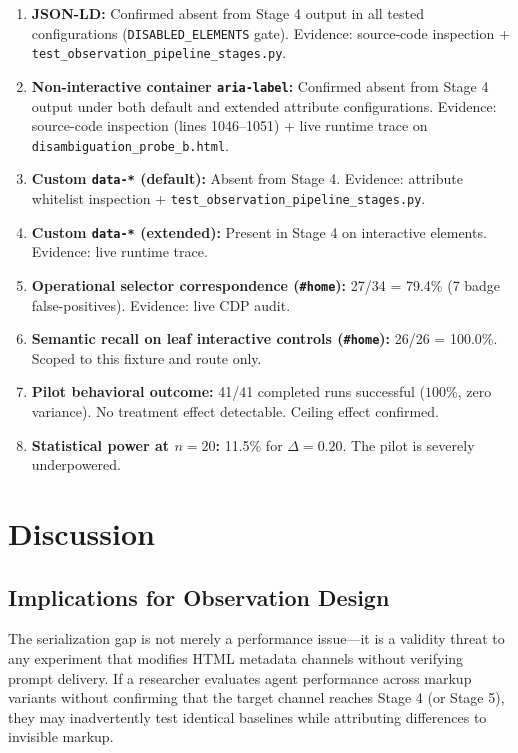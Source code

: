 \documentclass[conference]{IEEEtran}
\begin{document}
\begin{enumerate}
    \item \textbf{JSON-LD:} Confirmed absent from Stage 4 output in all tested configurations (\texttt{DISABLED\_ELEMENTS} gate). Evidence: source-code inspection + \texttt{test\_observation\_pipeline\_stages.py}.
    \item \textbf{Non-interactive container \texttt{aria-label}:} Confirmed absent from Stage 4 output under both default and extended attribute configurations. Evidence: source-code inspection (lines 1046--1051) + live runtime trace on \texttt{disambiguation\_probe\_b.html}.
    \item \textbf{Custom \texttt{data-*} (default):} Absent from Stage 4. Evidence: attribute whitelist inspection + \texttt{test\_observation\_pipeline\_stages.py}.
    \item \textbf{Custom \texttt{data-*} (extended):} Present in Stage 4 on interactive elements. Evidence: live runtime trace.
    \item \textbf{Operational selector correspondence (\texttt{\#home}):} 27/34 = 79.4\% (7 badge false-positives). Evidence: live CDP audit.
    \item \textbf{Semantic recall on leaf interactive controls (\texttt{\#home}):} 26/26 = 100.0\%. Scoped to this fixture and route only.
    \item \textbf{Pilot behavioral outcome:} 41/41 completed runs successful ($100\%$, zero variance). No treatment effect detectable. Ceiling effect confirmed.
    \item \textbf{Statistical power at $n=20$:} 11.5\% for $\Delta=0.20$. The pilot is severely underpowered.
\end{enumerate}

\section{Discussion}
\label{sec:discussion}

\subsection{Implications for Observation Design}

The serialization gap is not merely a performance issue---it is a validity threat to any experiment that modifies HTML metadata channels without verifying prompt delivery. If a researcher evaluates agent performance across markup variants without confirming that the target channel reaches Stage 4 (or Stage 5), they may inadvertently test identical baselines while attributing differences to invisible markup.
\end{document}

